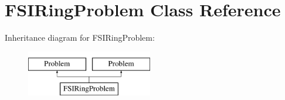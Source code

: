 \hypertarget{classFSIRingProblem}{}\section{F\+S\+I\+Ring\+Problem Class Reference}
\label{classFSIRingProblem}
Inheritance diagram for F\+S\+I\+Ring\+Problem\+:\begin{figure}[H]
\begin{center}
\leavevmode
\includegraphics[height=2.000000cm]{classFSIRingProblem}
\end{center}
\end{figure}
